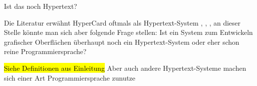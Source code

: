 \begin{section}{Ist das noch Hypertext?}
\label{sec:nochHypertext}

Die Literatur erwähnt HyperCard oftmals als Hypertext-System \cite{Nielsen1995}, \cite{Dam1988}, \cite{Smith1988}, an dieser Stelle könnte man sich aber folgende Frage stellen: Ist ein System zum Entwickeln grafischer Oberflächen überhaupt noch ein Hypertext-System oder eher schon reine Programmiersprache?

\hl{Siehe Definitionen aus Einleitung}
Aber auch andere Hypertext-Systeme machen sich einer Art Programmiersprache zunutze

\end{section}